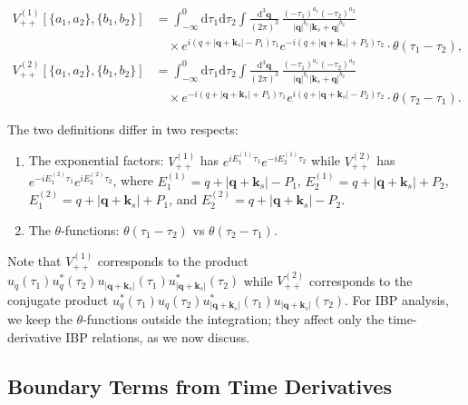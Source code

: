 \documentclass[a4paper,12pt]{article}
\def\di{{\mathrm{d}}}
\begin{document}
\begin{align}
	V_{++}^{(1)}[\{a_1,a_2\},\{b_1,b_2\}] & = \int_{-\infty}^0 \di\tau_1\di\tau_2 \int \frac{\di^3\bm q}{(2\pi)^3} \,
	\frac{(-\tau_1)^{a_1}(-\tau_2)^{a_2}}{|\bm q|^{b_1}|\bm k_s+\bm q|^{b_2}}                                          \nonumber                                                \\
	                                      & \quad \times e^{i(q+|\bm q+\bm k_s|-P_1)\tau_1} e^{-i(q+|\bm q+\bm k_s|+P_2)\tau_2} \cdot \theta(\tau_1-\tau_2), \label{eq:Vpp1def} \\[6pt]
	V_{++}^{(2)}[\{a_1,a_2\},\{b_1,b_2\}] & = \int_{-\infty}^0 \di\tau_1\di\tau_2 \int \frac{\di^3\bm q}{(2\pi)^3} \,
	\frac{(-\tau_1)^{a_1}(-\tau_2)^{a_2}}{|\bm q|^{b_1}|\bm k_s+\bm q|^{b_2}}                                          \nonumber                                                \\
	                                      & \quad \times e^{-i(q+|\bm q+\bm k_s|+P_1)\tau_1} e^{i(q+|\bm q+\bm k_s|-P_2)\tau_2} \cdot \theta(\tau_2-\tau_1). \label{eq:Vpp2def}
\end{align}

The two definitions differ in two respects:
\begin{enumerate}
	\item The exponential factors: $V_{++}^{(1)}$ has $e^{iE_1^{(1)}\tau_1}e^{-iE_2^{(1)}\tau_2}$ while $V_{++}^{(2)}$ has $e^{-iE_1^{(2)}\tau_1}e^{iE_2^{(2)}\tau_2}$, where $E_1^{(1)} = q+|\bm q+\bm k_s|-P_1$, $E_2^{(1)} = q+|\bm q+\bm k_s|+P_2$, $E_1^{(2)} = q+|\bm q+\bm k_s|+P_1$, and $E_2^{(2)} = q+|\bm q+\bm k_s|-P_2$.
	\item The $\theta$-functions: $\theta(\tau_1-\tau_2)$ vs $\theta(\tau_2-\tau_1)$.
\end{enumerate}

Note that $V_{++}^{(1)}$ corresponds to the product $u_q(\tau_1)u_q^*(\tau_2)u_{|\bm q+\bm k_s|}(\tau_1)u_{|\bm q+\bm k_s|}^*(\tau_2)$ while $V_{++}^{(2)}$ corresponds to the conjugate product $u_q^*(\tau_1)u_q(\tau_2)u_{|\bm q+\bm k_s|}^*(\tau_1)u_{|\bm q+\bm k_s|}(\tau_2)$. For IBP analysis, we keep the $\theta$-functions outside the integration; they affect only the time-derivative IBP relations, as we now discuss.

\subsection{Boundary Terms from Time Derivatives}
\end{document}
